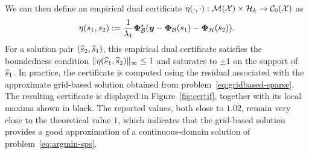 \documentclass[12pt]{article}
\begin{document}
        We can then define an empirical dual certificate $\eta(\cdot, \cdot): {\mathcal{M}}({\mathcal{X}}) \times \mathcal{H}_k \to {\mathcal{C}}_0({\mathcal{X}})$ as
        \begin{equation}
            \eta(s_1, s_2) := \frac{1}{\lambda_{1}} \bm{\Phi}_\mathcal{B}^*(\bm{y}  - \bm{\Phi}_\mathcal{B}(s_1) - \bm{\Phi}_\mathcal{H}(s_2)).
        \end{equation}
        For a solution pair $(\widehat{s}_2, \widehat{s}_1)$, this empirical dual certificate satisfies the boundedness condition $\| \eta(\widehat{s}_1, \widehat{s}_2) \|_\infty \leq 1$ and saturates to $\pm 1$ on the support of $\widehat{s}_1$.
        In practice, the certificate is computed using the residual associated with the approximate grid-based solution obtained from problem~\eqref{eq:gridbased-sparse}. The resulting certificate is displayed in Figure~\ref{fig:certif}, together with its local maxima shown in black. The reported values, both close to $1.02$, remain very close to the theoretical value $1$, which indicates that the grid-based solution provides a good approximation of a continuous-domain solution of problem~\eqref{eq:argmin-sps}.
\end{document}
